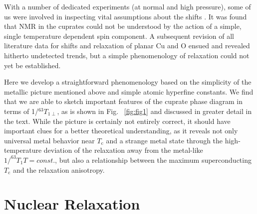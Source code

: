\documentclass[preprint,superscriptaddress,amsmath,amssymb,aps,physrev,prb,floatfix, fleqn]{revtex4-2} \usepackage{bm} %
\makeatletter
\newcommand{\tc} {\ensuremath{T_{\mathrm c}}\@\xspace}
\makeatother
\begin{document}
With a number of dedicated experiments (at normal and high pressure), some of us were involved in inspecting vital assumptions about the shifts \cite{Haase2009b,Meissner2011,Haase2012,Rybicki2015}. It was found that NMR in the cuprates could not be understood by the action of a simple, single temperature dependent spin component. A subsequent revision of all literature data for shifts and relaxation of planar Cu and O ensued \cite{Haase2017,Jurkutat2019,Nachtigal2020,Avramovska2022,Bandur2026} and revealed hitherto undetected trends, but a simple phenomenology of relaxation could not yet be established. 


Here we develop a straightforward phenomenology based on the simplicity of the metallic picture mentioned above and simple atomic hyperfine constants. We find that we are able to sketch important features of the cuprate phase diagram in terms of 1/$^{63}T_{1\perp}$, as is shown in Fig. ~\ref{fig:fig1} and discussed in greater detail in the text. While the picture is certainly not entirely correct, it should have important clues for a better theoretical understanding, as it reveals not only universal metal behavior near \tc and a strange metal state through the high-temperature deviation of the relaxation away from the metal-like $1/^{63}T_1T=const.$, but also a relationship between the maximum superconducting \tc and the relaxation anisotropy. 


\section{Nuclear Relaxation}
\end{document}

